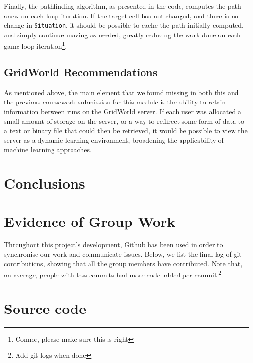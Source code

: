 \documentclass[11pt]{article}
\begin{document}
Finally, the pathfinding algorithm, as presented in the code, computes the path anew on each loop iteration. If the target cell has not changed, and there is no change in \verb|Situation|, it should be possible to cache the path initially computed, and simply continue moving as needed, greatly reducing the work done on each game loop iteration\footnote{Connor, please make sure this is right}.

\subsection{GridWorld Recommendations}
As mentioned above, the main element that we found missing in both this and the previous coursework submission for this module is the ability to retain information between runs on the GridWorld server. If each user was allocated a small amount of storage on the server, or a way to redirect some form of data to a text or binary file that could then be retrieved, it would be possible to view the server as a dynamic learning environment, broadening the applicability of machine learning approaches.
\section{Conclusions}

\newpage
{}



\newpage
\appendix

\section{Evidence of Group Work}
Throughout this project's development, Github has been used in order to synchronise our work and communicate issues. Below, we list the final log of git contributions, showing that all the group members have contributed. Note that, on average, people with less commits had more code added per commit.\footnote{Add git logs when done}
\section{Source code}
\end{document}
